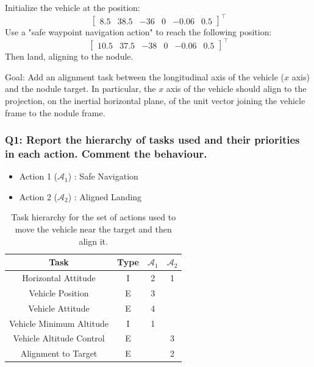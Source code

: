 \documentclass{article}
\begin{document}
Initialize the vehicle at the position:
\begin{displaymath}
\begin{bmatrix} 8.5 & 38.5 & -36 & 0 & -0.06 & 0.5 \end{bmatrix}^\top
\end{displaymath}
Use a "safe waypoint navigation action" to reach the following position:
\begin{displaymath}
\begin{bmatrix} 10.5 & 37.5 & -38 & 0 & -0.06 & 0.5 \end{bmatrix}^\top
\end{displaymath}
Then land, aligning to the nodule.

Goal: Add an alignment task between the longitudinal axis of the vehicle ($x$ axis) and the nodule target. In particular, the $x$ axis of the vehicle should align to the projection, on the inertial horizontal plane, of the unit vector joining the vehicle frame to the nodule frame.

\subsubsection{Q1: Report the hierarchy of tasks used and their priorities in each action. Comment the behaviour.}

\begin{table}[htb]
	\caption{Task hierarchy for the set of actions used to move the vehicle near the target and then align it.}
	\begin{itemize}
		\item Action 1 ($\mathcal{A}_{1}$) : Safe Navigation
		\item Action 2 ($\mathcal{A}_{2}$) : Aligned Landing
	\end{itemize}
	\label{tb_align:actions_table}
	\begin{center}
		\footnotesize
		\begin{tabular}{cccc}
			\toprule
			Task & Type & $\mathcal{A}_{1}$ & $\mathcal{A}_{2}$ \\
			\midrule
			Horizontal Attitude             & I & 2 & 1 \\
			\hdashline
			Vehicle Position				& E & 3 &   \\
			\hdashline
			Vehicle Attitude                & E & 4 &   \\
			\hdashline
			Vehicle Minimum Altitude        & I & 1 &   \\
			\hdashline
			Vehicle Altitude Control        & E &   & 3 \\
			\hdashline
			Alignment to Target             & E &   & 2 \\
			
			\bottomrule
		\end{tabular}
	\end{center}
\end{table}%
\end{document}
